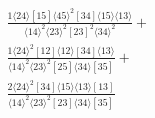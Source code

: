 \documentclass[varwidth, border=5pt]{standalone}
\begin{document}
\begin{my}
$\begin{gathered}
\scriptscriptstyle\frac{1⟨24⟩[15]⟨45⟩^2[34]⟨15⟩⟨13⟩}{⟨14⟩^2⟨23⟩^2[23]^2⟨34⟩^2}+\\
\scriptscriptstyle\frac{1⟨24⟩^2[12]⟨12⟩[34]⟨13⟩}{⟨14⟩^2⟨23⟩^2[25]⟨34⟩[35]}+\\
\scriptscriptstyle\frac{2⟨24⟩^2[34]⟨15⟩⟨13⟩[13]}{⟨14⟩^2⟨23⟩^2[23]⟨34⟩[35]}\phantom{+}
\end{gathered}$
\end{my}
\end{document}
